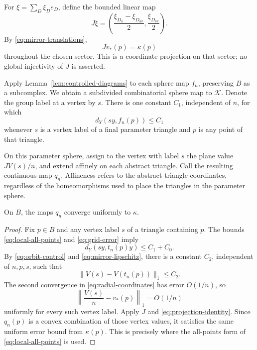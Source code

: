 For \(\xi=\sum_D\xi_D e_D\), define the bounded linear map
\begin{equation}\label{eq:coordinate-projection}
 J\xi=\left(\frac{\xi_{D_u}-\xi_{D_{uv}}}{2},
                 \frac{\xi_{D_{uv}}}{2}\right).
\end{equation}
By \eqref{eq:mirror-translations},
\begin{equation}\label{eq:projection-identity}
 Jv_*(p)=\kappa(p)
\end{equation}
throughout the chosen sector.  This is a coordinate projection on that
sector; no global injectivity of \(J\) is asserted.

Apply Lemma~\ref{lem:controlled-diagrams} to each sphere map \(f_n\),
preserving \(B\) as a subcomplex.  We obtain a subdivided combinatorial
sphere map to \(\mathcal K\).  Denote the group label at a vertex by
\(s\).  There is one constant \(C_1\), independent of \(n\), for which
\begin{equation}\label{eq:local-all-points}
 d_Y(sy,f_n(p))\le C_1
\end{equation}
whenever \(s\) is a vertex label of a final parameter triangle and
\(p\) is any point of that triangle.

On this parameter sphere, assign to the vertex with label \(s\) the
plane value \(JV(s)/n\), and extend affinely on each abstract triangle.
Call the resulting continuous map \(q_n\).  Affineness refers to the
abstract triangle coordinates, regardless of the homeomorphisms used
to place the triangles in the parameter sphere.

\begin{lemma}\label{lem:projected-approximation}
On \(B\), the maps \(q_n\) converge uniformly to \(\kappa\).
\end{lemma}

\begin{proof}
Fix \(p\in B\) and any vertex label \(s\) of a triangle containing \(p\).
The bounds \eqref{eq:local-all-points} and \eqref{eq:grid-error} imply
\[
 d_Y(sy,t_n(p)y)\le C_1+C_0.
\]
By \eqref{eq:orbit-control} and \eqref{eq:mirror-lipschitz}, there is a
constant \(C_2\), independent of \(n,p,s\), such that
\[
 \|V(s)-V(t_n(p))\|_1\le C_2.
\]
The second convergence in \eqref{eq:radial-coordinates} has error
\(O(1/n)\), so
\[
 \left\|\frac{V(s)}n-v_*(p)\right\|_1=O(1/n)
\]
uniformly for every such vertex label.  Apply \(J\) and
\eqref{eq:projection-identity}.  Since \(q_n(p)\) is a convex combination
of those vertex values, it satisfies the same uniform error bound from
\(\kappa(p)\).  This is precisely where the all-points form of
\eqref{eq:local-all-points} is used.
\end{proof}

